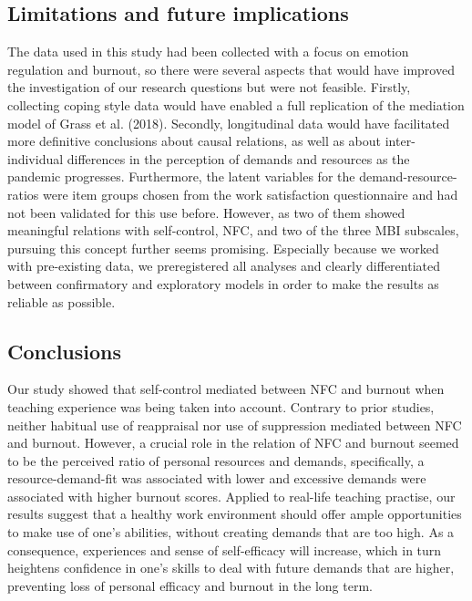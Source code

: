 \documentclass[
  english,
  man,floatsintext]{apa6}
\begin{document}
\hypertarget{limitations-and-future-implications}{%
\subsection{Limitations and future implications}\label{limitations-and-future-implications}}

The data used in this study had been collected with a focus on emotion regulation and burnout, so there were several aspects that would have improved the investigation of our research questions but were not feasible.
Firstly, collecting coping style data would have enabled a full replication of the mediation model of Grass et al. (2018).
Secondly, longitudinal data would have facilitated more definitive conclusions about causal relations, as well as about inter-individual differences in the perception of demands and resources as the pandemic progresses.
Furthermore, the latent variables for the demand-resource-ratios were item groups chosen from the work satisfaction questionnaire and had not been validated for this use before.
However, as two of them showed meaningful relations with self-control, NFC, and two of the three MBI subscales, pursuing this concept further seems promising.
Especially because we worked with pre-existing data, we preregistered all analyses and clearly differentiated between confirmatory and exploratory models in order to make the results as reliable as possible.

\hypertarget{conclusions}{%
\subsection{Conclusions}\label{conclusions}}

Our study showed that self-control mediated between NFC and burnout when teaching experience was being taken into account.
Contrary to prior studies, neither habitual use of reappraisal nor use of suppression mediated between NFC and burnout.
However, a crucial role in the relation of NFC and burnout seemed to be the perceived ratio of personal resources and demands, specifically, a resource-demand-fit was associated with lower and excessive demands were associated with higher burnout scores.
Applied to real-life teaching practise, our results suggest that a healthy work environment should offer ample opportunities to make use of one's abilities, without creating demands that are too high.
As a consequence, experiences and sense of self-efficacy will increase, which in turn heightens confidence in one's skills to deal with future demands that are higher, preventing loss of personal efficacy and burnout in the long term.
\end{document}
